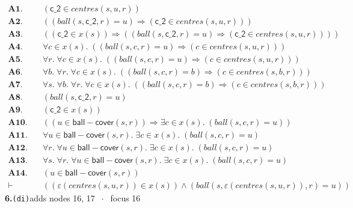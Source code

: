 \documentclass[11pt]{article}
\begin{document}
\begin{align*}
  \mathbf{A1.}\quad & (\mathsf{c\_2} \in \mathit{centres}(s, u, r)) \\
  \mathbf{A2.}\quad & ((\mathit{ball}(s, \mathsf{c\_2}, r) = u) \Rightarrow (\mathsf{c\_2} \in \mathit{centres}(s, u, r))) \\
  \mathbf{A3.}\quad & ((\mathsf{c\_2} \in x(s)) \Rightarrow ((\mathit{ball}(s, \mathsf{c\_2}, r) = u) \Rightarrow (\mathsf{c\_2} \in \mathit{centres}(s, u, r)))) \\
  \mathbf{A4.}\quad & \forall c \in x(s).\; ((\mathit{ball}(s, c, r) = u) \Rightarrow (c \in \mathit{centres}(s, u, r))) \\
  \mathbf{A5.}\quad & \forall r.\; \forall c \in x(s).\; ((\mathit{ball}(s, c, r) = u) \Rightarrow (c \in \mathit{centres}(s, u, r))) \\
  \mathbf{A6.}\quad & \forall b.\; \forall r.\; \forall c \in x(s).\; ((\mathit{ball}(s, c, r) = b) \Rightarrow (c \in \mathit{centres}(s, b, r))) \\
  \mathbf{A7.}\quad & \forall s.\; \forall b.\; \forall r.\; \forall c \in x(s).\; ((\mathit{ball}(s, c, r) = b) \Rightarrow (c \in \mathit{centres}(s, b, r))) \\
  \mathbf{A8.}\quad & (\mathit{ball}(s, \mathsf{c\_2}, r) = u) \\
  \mathbf{A9.}\quad & (\mathsf{c\_2} \in x(s)) \\
  \mathbf{A10.}\quad & ((u \in \mathsf{ball{-}cover}(s, r)) \Rightarrow \exists c \in x(s).\; (\mathit{ball}(s, c, r) = u)) \\
  \mathbf{A11.}\quad & \forall u \in \mathsf{ball{-}cover}(s, r).\; \exists c \in x(s).\; (\mathit{ball}(s, c, r) = u) \\
  \mathbf{A12.}\quad & \forall r.\; \forall u \in \mathsf{ball{-}cover}(s, r).\; \exists c \in x(s).\; (\mathit{ball}(s, c, r) = u) \\
  \mathbf{A13.}\quad & \forall s.\; \forall r.\; \forall u \in \mathsf{ball{-}cover}(s, r).\; \exists c \in x(s).\; (\mathit{ball}(s, c, r) = u) \\
  \mathbf{A14.}\quad & (u \in \mathsf{ball{-}cover}(s, r)) \\
  \vdash\quad & ((\varepsilon(\mathit{centres}(s, u, r)) \in x(s)) \wedge (\mathit{ball}(s, \varepsilon(\mathit{centres}(s, u, r)), r) = u))
\end{align*}
\medskip\noindent\textbf{6.}\quad \texttt{(di)}\hfill{\small adds nodes 16, 17 $\;\cdot\;$ focus 16}\\[2pt]
\end{document}
